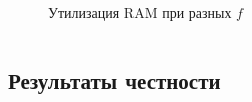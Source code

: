\documentclass[t]{beamer}  %
\begin{document}
\begin{frame}[fragile]
\begin{columns}
\begin{column}{0.6\linewidth}
\begin{figure}[H]
					\caption*{Утилизация RAM при разных $f$}
				\end{figure}
		\end{column}
	\end{columns}

	
\end{frame}




\subsection{Результаты честности}

\begin{frame}[fragile]
	\frametitle{\insertsection} 
	\framesubtitle{\insertsubsection}

	\vspace{-0.5cm}
	

\end{frame}
\end{document}
